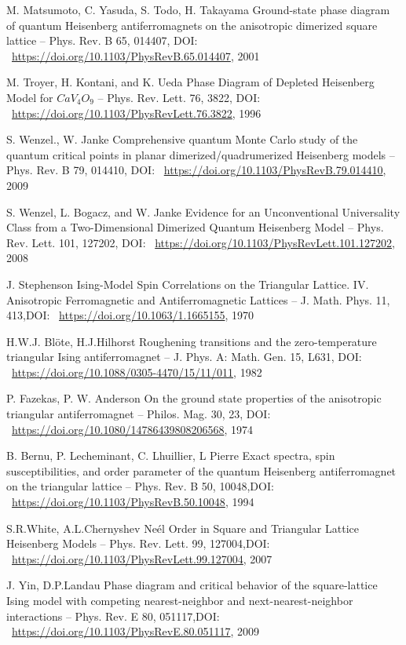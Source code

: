 \documentclass[11pt]{article}
\begin{document}
\begin{thebibliography}{3}
M. Matsumoto, C. Yasuda, S. Todo, H. Takayama Ground-state phase diagram of quantum Heisenberg antiferromagnets on the anisotropic dimerized square lattice -- Phys. Rev. B 65, 014407, DOI: ~\url{https://doi.org/10.1103/PhysRevB.65.014407}, 2001

M. Troyer, H. Kontani, and K. Ueda Phase Diagram of Depleted Heisenberg Model for $CaV_4O_9$ -- Phys. Rev. Lett. 76, 3822, DOI: ~\url{https://doi.org/10.1103/PhysRevLett.76.3822}, 1996

S. Wenzel., W. Janke Comprehensive quantum Monte Carlo study of the quantum critical points in planar dimerized/quadrumerized Heisenberg models -- Phys. Rev. B 79, 014410, DOI: ~\url{https://doi.org/10.1103/PhysRevB.79.014410}, 2009

S. Wenzel, L. Bogacz, and W. Janke Evidence for an Unconventional Universality Class from a Two-Dimensional Dimerized Quantum Heisenberg Model -- Phys. Rev. Lett. 101, 127202, DOI: ~\url{https://doi.org/10.1103/PhysRevLett.101.127202}, 2008

J. Stephenson Ising-Model Spin Correlations on the Triangular Lattice. IV. Anisotropic Ferromagnetic and Antiferromagnetic Lattices  -- J. Math. Phys. 11, 413,DOI: ~\url{https://doi.org/10.1063/1.1665155}, 1970

H.W.J. Blöte, H.J.Hilhorst Roughening transitions and the zero-temperature triangular Ising antiferromagnet -- J. Phys. A: Math. Gen. 15, L631, DOI: ~\url{https://doi.org/10.1088/0305-4470/15/11/011}, 1982

P. Fazekas, P. W. Anderson On the ground state properties of the anisotropic triangular antiferromagnet -- Philos. Mag. 30, 23, DOI: ~\url{https://doi.org/10.1080/14786439808206568}, 1974

B. Bernu, P. Lecheminant, C. Lhuillier, L Pierre Exact spectra, spin susceptibilities, and order parameter of the quantum Heisenberg antiferromagnet on the triangular lattice -- Phys. Rev. B 50, 10048,DOI: ~\url{https://doi.org/10.1103/PhysRevB.50.10048}, 1994

S.R.White, A.L.Chernyshev Neél Order in Square and Triangular Lattice Heisenberg Models -- Phys. Rev. Lett. 99, 127004,DOI: ~\url{https://doi.org/10.1103/PhysRevLett.99.127004}, 2007

J. Yin, D.P.Landau Phase diagram and critical behavior of the square-lattice Ising model with competing nearest-neighbor and next-nearest-neighbor interactions -- Phys. Rev. E 80, 051117,DOI: ~\url{https://doi.org/10.1103/PhysRevE.80.051117}, 2009


\end{thebibliography}
\end{document}
